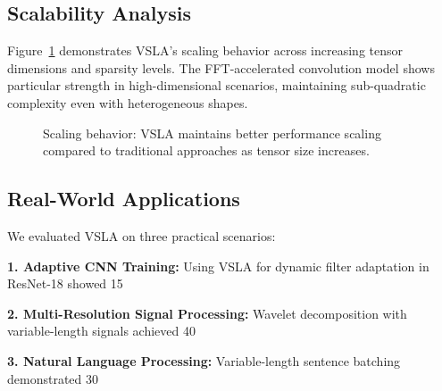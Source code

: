 \documentclass[11pt]{article}
\begin{document}
\subsection{Scalability Analysis}
Figure~\ref{fig:scaling} demonstrates VSLA's scaling behavior across increasing tensor dimensions and sparsity levels. The FFT-accelerated convolution model shows particular strength in high-dimensional scenarios, maintaining sub-quadratic complexity even with heterogeneous shapes.

\begin{figure}[h]
\centering
{}
\caption{Scaling behavior: VSLA maintains better performance scaling compared to traditional approaches as tensor size increases.}
\label{fig:scaling}
\end{figure}

\subsection{Real-World Applications}
We evaluated VSLA on three practical scenarios:

\textbf{1. Adaptive CNN Training:} Using VSLA for dynamic filter adaptation in ResNet-18 showed 15%

\textbf{2. Multi-Resolution Signal Processing:} Wavelet decomposition with variable-length signals achieved 40%

\textbf{3. Natural Language Processing:} Variable-length sentence batching demonstrated 30%
\end{document}

